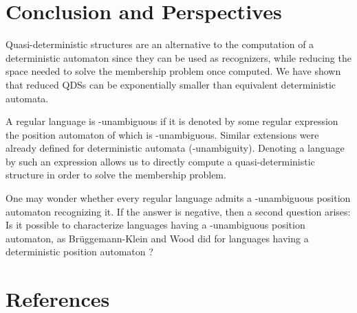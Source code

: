 \documentclass[11pt]{elsarticle}
\begin{document}
 








\section{Conclusion and Perspectives}

Quasi-deterministic structures are an alternative to the computation of a deterministic automaton since they can be used as recognizers, while reducing the space needed to solve the membership problem once computed.
We have  shown that reduced QDSs can be exponentially smaller than equivalent deterministic automata. 








A regular language is -unambiguous if it is denoted by some regular expression the position automaton of which is -unambiguous. 
Similar extensions were already defined for deterministic automata (-unambiguity). 
Denoting a language by such an expression allows us to directly compute a quasi-deterministic structure in order to solve the membership problem.  
  
One may wonder whether every regular language admits a -unam\-biguous position automaton recognizing it.
If the answer is negative, then a second question arises: Is it possible to characterize languages having a -unam\-biguous position automaton, as Br\"uggemann-Klein and Wood did for languages having a deterministic position automaton ?





\section*{References}








  
\end{document}
